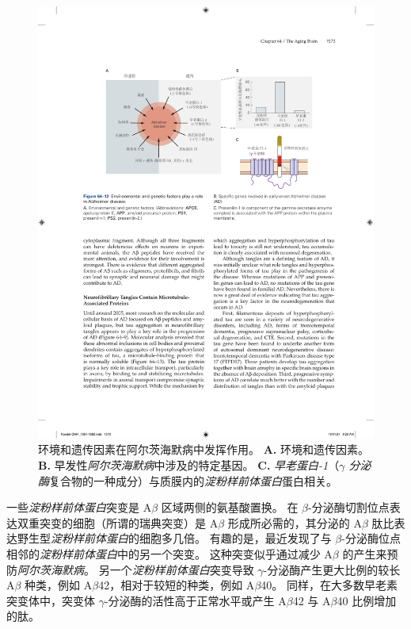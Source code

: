 \begin{figure}[htbp]
	\centering
	\includegraphics[width=1.0\linewidth]{chap64/fig_64_12}
	\caption{环境和遗传因素在阿尔茨海默病中发挥作用。
		\textbf{A.} 环境和遗传因素。
		\textbf{B.} 早发性\textit{阿尔茨海默病}中涉及的特定基因。
		\textbf{C.} \textit{早老蛋白-1}（\textit{$\gamma$ 分泌酶}复合物的一种成分）与质膜内的\textit{淀粉样前体蛋白}蛋白相关。}
	\label{fig:64_12}
\end{figure}


一些\textit{淀粉样前体蛋白}突变是 A$\beta$ 区域两侧的氨基酸置换。
在 $\beta$-分泌酶切割位点表达双重突变的细胞（所谓的瑞典突变）是 A$\beta$ 形成所必需的，其分泌的 A$\beta$ 肽比表达野生型\textit{淀粉样前体蛋白}的细胞多几倍。
有趣的是，最近发现了与 $\beta$-分泌酶位点相邻的\textit{淀粉样前体蛋白}中的另一个突变。
这种突变似乎通过减少 A$\beta$ 的产生来预防\textit{阿尔茨海默病}。
另一个\textit{淀粉样前体蛋白}突变导致 $\gamma$-分泌酶产生更大比例的较长 A$\beta$ 种类，例如 A$\beta$42，相对于较短的种类，例如 A$\beta$40。
同样，在大多数早老素突变体中，突变体 $\gamma$-分泌酶的活性高于正常水平或产生 A$\beta$42 与 A$\beta$40 比例增加的肽。


